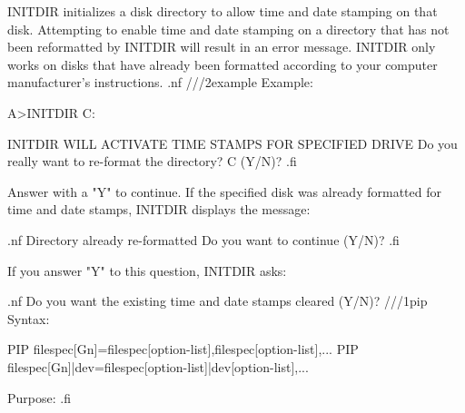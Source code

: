 INITDIR initializes a disk directory to allow time and date stamping
on that disk. Attempting to enable time and date stamping on a directory
that has not been reformatted by INITDIR will result in an error message.
INITDIR only works on disks that have already been formatted according
to your computer manufacturer's instructions. 
.nf
///2example
Example:

      A>INITDIR C:

      INITDIR WILL ACTIVATE TIME STAMPS FOR SPECIFIED DRIVE
      Do you really want to re-format the directory?  C (Y/N)?
.fi

Answer with a "Y" to continue. If the specified disk was already formatted
for time and date stamps, INITDIR displays the message:

.nf
      Directory already re-formatted
      Do you want to continue (Y/N)?
.fi 

If you answer "Y" to this question, INITDIR asks:

.nf
      Do you want the existing time and date stamps cleared (Y/N)?
///1pip
Syntax:

PIP filespec{[Gn]}=filespec{[option-list]}{,filespec[option-list],...}
PIP filespec{[Gn]}|dev=filespec{[option-list]}|dev{[option-list]}{,...}

Purpose:
.fi

